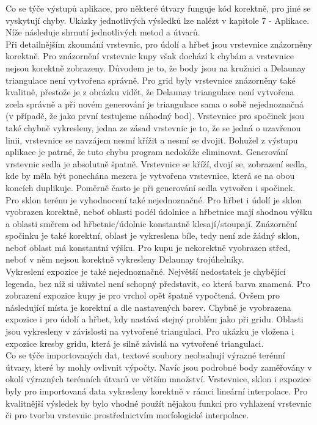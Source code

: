 \documentclass[a4paper, 12pt]{article}
\begin{document}
Co se týče výstupů aplikace, pro některé útvary funguje kód korektně, pro jiné se vyskytují chyby. Ukázky jednotlivých výsledků lze nalézt v kapitole 7 
- Aplikace. Níže následuje shrnutí jednotlivých metod a útvarů.\\

Při detailnějším zkoumání vrstevnic, pro údolí a hřbet jsou vrstevnice znázorněny korektně. Pro znázornění vrstevnic kupy však dochází k chybám a vrstevnice nejsou korektně zobrazeny. Důvodem je to, že body jsou na kružnici a Delaunay triangulace není vytvořena správně. Pro grid byly vrstevnice znázorněny také kvalitně, přestože je z obrázku vidět, že Delaunay triangulace není vytvořena zcela správně a při novém generování je triangulace sama o sobě nejednoznačná (v případě, že jako první testujeme náhodný bod). Vrstevnice pro spočinek jsou také chybně vykresleny, jedna ze zásad vrstevnic je to, že se jedná o uzavřenou linii, vrstevnice se navzájem nesmí křížit a nesmí se dvojit. Bohužel z výstupu aplikace je patrné, že tuto chybu program nedokáže eliminovat. Generování vrstevnic sedla je absolutně špatně. Vrstevnice se kříží, dvojí se, zobrazení sedla, kde by měla být ponechána mezera je vytvořena vrstevnice, která se na obou koncích duplikuje. Poměrně často je při generování sedla vytvořen i spočinek. \\

Pro sklon terénu je vyhodnocení také nejednoznačné. Pro hřbet i údolí je sklon vyobrazen korektně, neboť oblasti podél údolnice a hřbetnice mají shodnou výšku a oblasti směrem od hřbetnic/údolnic konstantně klesají/stoupají. Znázornění spočinku je také korektní, oblast je vykreslena bíle, tedy není zde žádný sklon, neboť oblast má konstantní výšku. Pro kupu je nekorektně vyobrazen střed, neboť v něm nejsou korektně vykresleny Delaunay trojúhelníky. \\

Vykreslení expozice je také nejednoznačné. Největší nedostatek je chybějící legenda, bez níž si uživatel není schopný představit, co která barva znamená. Pro zobrazení expozice kupy je pro vrchol opět špatně vypočtená. Ovšem pro následující místa je korektní a dle nastavených barev. Chybně je vyobrazena expozice i pro údolí a hřbet, kdy nastává stejný problém jako při gridu. Oblasti jsou vykresleny v závislosti na vytvořené triangulaci. Pro ukázku je vložena i expozice kresby gridu, která je silně závislá na vytvořené triangulaci. \\

Co se týče importovaných dat, textové soubory neobsahují výrazné terénní útvary, které by mohly ovlivnit výpočty. Navíc jsou podrobné body zaměřovány v okolí výrazných terénních útvarů ve větším množství. Vrstevnice, sklon i expozice byly pro importovaná data vykresleny korektně v rámci lineární interpolace. Pro kvalitnější výsledek by bylo vhodné použít nějakou funkci pro vyhlazení vrstevnic či pro tvorbu vrstevnic prostřednictvím morfologické interpolace.
\end{document}
